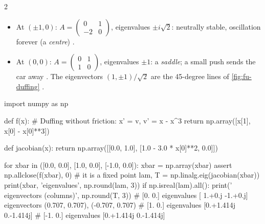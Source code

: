 \begin{paracol}{2}
\begin{casestudy}
\begin{itemize}
  \item At $(\pm1,0)$: $A=\begin{pmatrix}0&1\\-2&0\end{pmatrix}$, eigenvalues $\pm i\sqrt2$: neutrally
        stable, oscillation forever (a \emph{centre}) .
  \item At $(0,0)$: $A=\begin{pmatrix}0&1\\1&0\end{pmatrix}$, eigenvalues $\pm1$: a \emph{saddle};
        a small push sends the car away . The eigenvectors $(1,\pm1)/\sqrt2$ are the
        45-degree lines of \cref{fig:fu-duffing} .
\end{itemize}
\end{casestudy}

\begin{code}
import numpy as np

def f(x):                      # Duffing without friction: x' = v, v' = x - x^3
    return np.array([x[1], x[0] - x[0]**3])

def jacobian(x):
    return np.array([[0.0, 1.0],
                     [1.0 - 3.0 * x[0]**2, 0.0]])

for xbar in ([0.0, 0.0], [1.0, 0.0], [-1.0, 0.0]):
    xbar = np.array(xbar)
    assert np.allclose(f(xbar), 0)           # it is a fixed point
    lam, T = np.linalg.eig(jacobian(xbar))
    print(xbar, 'eigenvalues', np.round(lam, 3))
    if np.isreal(lam).all():
        print('   eigenvectors (columns)\n', np.round(T, 3))
# [0. 0.]  eigenvalues [ 1.+0.j -1.+0.j]   eigenvectors (0.707, 0.707), (-0.707, 0.707)
# [1. 0.]  eigenvalues [0.+1.414j 0.-1.414j]
# [-1. 0.] eigenvalues [0.+1.414j 0.-1.414j]
\end{code}


\end{paracol}
